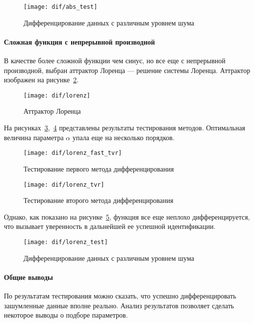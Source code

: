 \begin{figure}
\texttt{[image: dif/abs\_test]}
\caption{Дифференцирование данных с различным уровнем шума}
\label{fig:dif:abs_test}
\end{figure}

\paragraph{Сложная функция с непрерывной производной}

В качестве более сложной функции чем синус, но все еще с непрерывной производной, выбран аттрактор Лоренца --- решение системы Лоренца. Аттрактор изображен на рисунке~\ref{fig:dif:lorenz}.

\begin{figure}
\texttt{[image: dif/lorenz]}
\caption{Аттрактор Лоренца}
\label{fig:dif:lorenz}
\end{figure}

На рисунках~\ref{fig:dif:lorenz_fast_tvr},~\ref{fig:dif:lorenz_tvr} представлены результаты тестирования методов. Оптимальная величина параметра $\alpha$ упала еще на несколько порядков.

\begin{figure}
\texttt{[image: dif/lorenz\_fast\_tvr]}
\caption{Тестирование первого метода дифференцирования}
\label{fig:dif:lorenz_fast_tvr}
\end{figure}

\begin{figure}
\texttt{[image: dif/lorenz\_tvr]}
\caption{Тестирование второго метода дифференцирования}
\label{fig:dif:lorenz_tvr}
\end{figure}

Однако, как показано на рисунке~\ref{fig:dif:lorenz_test}, функция все еще неплохо дифференцируется, что вызывает уверенность в дальнейшей ее успешной идентификации.

\begin{figure}
\texttt{[image: dif/lorenz\_test]}
\caption{Дифференцирование данных с различным уровнем шума}
\label{fig:dif:lorenz_test}
\end{figure}

\paragraph{Общие выводы}

По результатам тестирования можно сказать, что успешно дифференцировать зашумленные данные вполне реально. Анализ результатов позволяет сделать некоторое выводы о подборе параметров.

